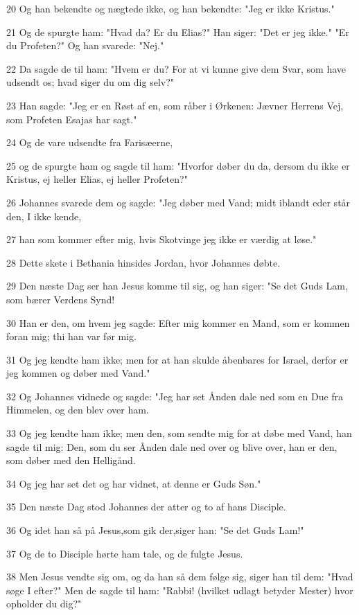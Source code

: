 \par 20 Og han bekendte og nægtede ikke, og han bekendte: "Jeg er ikke Kristus."
\par 21 Og de spurgte ham: "Hvad da? Er du Elias?" Han siger: "Det er jeg ikke." "Er du Profeten?" Og han svarede: "Nej."
\par 22 Da sagde de til ham: "Hvem er du? For at vi kunne give dem Svar, som have udsendt os; hvad siger du om dig selv?"
\par 23 Han sagde: "Jeg er en Røst af en, som råber i Ørkenen: Jævner Herrens Vej, som Profeten Esajas har sagt."
\par 24 Og de vare udsendte fra Farisæerne,
\par 25 og de spurgte ham og sagde til ham: "Hvorfor døber du da, dersom du ikke er Kristus, ej heller Elias, ej heller Profeten?"
\par 26 Johannes svarede dem og sagde: "Jeg døber med Vand; midt iblandt eder står den, I ikke kende,
\par 27 han som kommer efter mig, hvis Skotvinge jeg ikke er værdig at løse."
\par 28 Dette skete i Bethania hinsides Jordan, hvor Johannes døbte.
\par 29 Den næste Dag ser han Jesus komme til sig, og han siger: "Se det Guds Lam, som bærer Verdens Synd!
\par 30 Han er den, om hvem jeg sagde: Efter mig kommer en Mand, som er kommen foran mig; thi han var før mig.
\par 31 Og jeg kendte ham ikke; men for at han skulde åbenbares for Israel, derfor er jeg kommen og døber med Vand."
\par 32 Og Johannes vidnede og sagde: "Jeg har set Ånden dale ned som en Due fra Himmelen, og den blev over ham.
\par 33 Og jeg kendte ham ikke; men den, som sendte mig for at døbe med Vand, han sagde til mig: Den, som du ser Ånden dale ned over og blive over, han er den, som døber med den Helligånd.
\par 34 Og jeg har set det og har vidnet, at denne er Guds Søn."
\par 35 Den næste Dag stod Johannes der atter og to af hans Disciple.
\par 36 Og idet han så på Jesus,som gik der,siger han: "Se det Guds Lam!"
\par 37 Og de to Disciple hørte ham tale, og de fulgte Jesus.
\par 38 Men Jesus vendte sig om, og da han så dem følge sig, siger han til dem: "Hvad søge I efter?" Men de sagde til ham: "Rabbi! (hvilket udlagt betyder Mester) hvor opholder du dig?"
